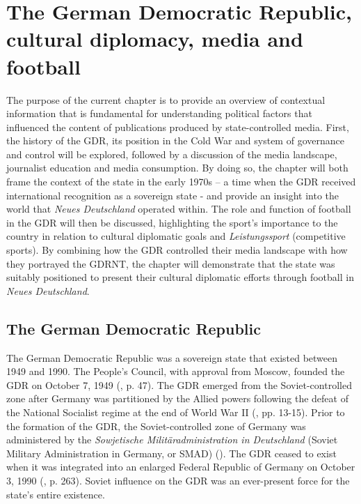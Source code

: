 \chapter{The German Democratic Republic, cultural diplomacy, media and football\label{cha:background}}

The purpose of the current chapter is to provide an overview of contextual information that is fundamental for understanding political factors that influenced the content of publications produced by state-controlled media. First, the history of the GDR, its position in the Cold War and system of governance and control will be explored, followed by a discussion of the media landscape, journalist education and media consumption. By doing so, the chapter will both frame the context of the state in the early 1970s – a time when the GDR received international recognition as a sovereign state - and provide an insight into the world that \textit{Neues Deutschland} operated within. The role and function of football in the GDR will then be discussed, highlighting the sport’s importance to the country in relation to cultural diplomatic goals and \textit{Leistungssport} (competitive sports). By combining how the GDR controlled their media landscape with how they portrayed the GDRNT, the chapter will demonstrate that the state was suitably positioned to present their cultural diplomatic efforts through football in \textit{Neues Deutschland}.

\section*{The German Democratic Republic}

The German Democratic Republic was a sovereign state that existed between 1949 and 1990. The People’s Council, with approval from Moscow, founded the GDR on October 7, 1949 (\cite{dennis2000}, p. 47). The GDR emerged from the Soviet-controlled zone after Germany was partitioned by the Allied powers following the defeat of the National Socialist regime at the end of World War II (\cite{dennis2000}, pp. 13-15). Prior to the formation of the GDR, the Soviet-controlled zone of Germany was administered by the \textit{Sowjetische Militäradministration in Deutschland} (Soviet Military Administration in Germany, or SMAD) (\cite{foitzik2009}). The GDR ceased to exist when it was integrated into an enlarged Federal Republic of Germany on October 3, 1990 (\cite{fullbrook1995}, p. 263). Soviet influence on the GDR was an ever-present force for the state’s entire existence.

